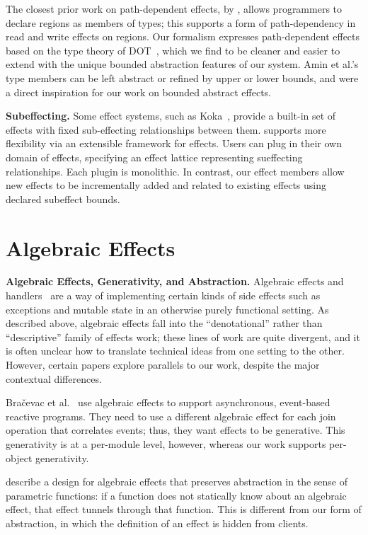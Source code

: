 The closest prior work on path-dependent effects, by \citet{grennhouse99}, allows programmers to declare regions as members of types; this supports a form of path-dependency in read and write effects on regions.  Our formalism expresses path-dependent effects based on the type theory of DOT~\cite{amin14}, which we find to be cleaner and easier to extend with the unique bounded abstraction features of our system.  Amin et al.'s type members can be left abstract or refined by upper or lower bounds, and were a direct inspiration for our work on bounded abstract effects.

\noindent\textbf{Subeffecting.} 
Some effect systems, such as Koka~\cite{leijen14}, provide a built-in set of effects with fixed sub-effecting relationships between them.
\citet{rytz12} supports more flexibility via an extensible framework for effects.  Users can plug in their own domain of effects, specifying an effect lattice representing sueffecting relationships.  Each plugin is monolithic.  In contrast, our effect members allow new effects to be incrementally added and related to existing effects using declared subeffect bounds.



\section{Algebraic Effects}
\noindent\textbf{Algebraic Effects, Generativity, and Abstraction.}  Algebraic effects and handlers~\cite{plotkin03,plotkin09} are a way of implementing certain kinds of side effects such as exceptions and mutable state in an otherwise purely functional setting.  As described above, algebraic effects fall into the ``denotational'' rather than ``descriptive'' family of effects work; these lines of work are quite divergent, and it is often unclear how to translate technical ideas from one setting to the other.  However, certain papers explore parallels to our work, despite the major contextual differences.


Bra\v{c}evac et al.~\cite{bracevac18} use algebraic effects to support asynchronous, event-based reactive programs. They need to use a different algebraic effect for each join operation that correlates events; thus, they want effects to be generative.  This generativity is at a per-module level, however, whereas our work supports per-object generativity.

\citet{Zhang19} describe a design for algebraic effects that preserves abstraction in the sense of parametric functions: if a function does not statically know about an algebraic effect, that effect tunnels through that function.  This is different from our form of abstraction, in which the definition of an effect is hidden from clients.

